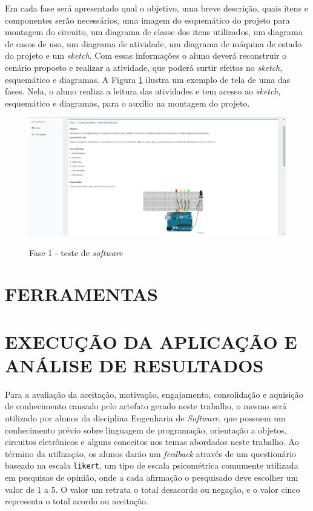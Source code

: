 Em cada fase será apresentado qual o objetivo, uma breve descrição, quais itens e componentes serão necessários, uma imagem do esquemático do projeto para montagem do circuito, um diagrama de classe dos itens utilizados, um diagrama de casos de uso, um diagrama de atividade, um diagrama de máquina de estado do projeto e um \textit{sketch}. Com essas informações o aluno deverá reconstruir o cenário proposto e realizar a atividade, que poderá surtir efeitos no \textit{sketch}, esquemático e diagramas. A Figura \ref{fig:figura-fase-tela} ilustra um exemplo de tela de uma das fases. Nela, o aluno realiza a leitura das atividades e tem acesso ao \textit{sketch}, esquemático e diagramas, para o auxílio na montagem do projeto. 
\begin{figure}[!htb]
    \centering
    \caption{Fase 1 - teste de \textit{software}}
    \includegraphics[width=1\textwidth]{./dados/figuras/faseTela}
    \label{fig:figura-fase-tela}
\end{figure}

\section{FERRAMENTAS}
\label{sec:ferramentas}

\section{EXECUÇÃO DA APLICAÇÃO E ANÁLISE DE RESULTADOS}
\label{sec:execAppAnaliseResultados}
Para a avaliação da aceitação, motivação, engajamento, consolidação e aquisição de conhecimento causado pelo artefato gerado neste trabalho, o mesmo será utilizado por alunos da disciplina Engenharia de \textit{Software}, que possuem um conhecimento prévio sobre linguagem de programação, orientação a objetos, circuitos eletrônicos e alguns conceitos nos temas abordados neste trabalho. Ao término da utilização, os alunos darão um \textit{feedback} através de um questionário baseado na escala \texttt{likert}, um tipo de escala psicométrica comumente utilizada em pesquisas de opinião, onde a cada afirmação o pesquisado deve escolher um valor de 1 a 5. O valor um retrata o total desacordo ou negação, e o valor cinco representa o total acordo ou aceitação.


